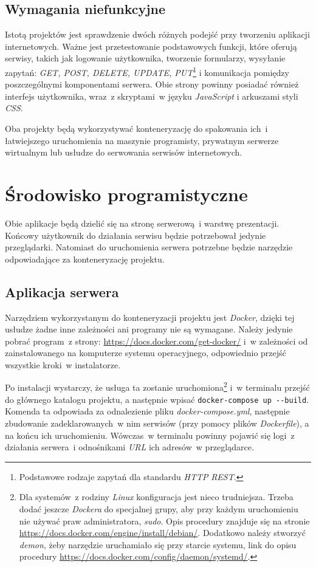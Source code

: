 \subsection{Wymagania niefunkcyjne}
Istotą projektów jest sprawdzenie dwóch różnych podejść przy tworzeniu aplikacji internetowych. Ważne jest przetestowanie podstawowych funkcji, które oferują serwisy, takich jak logowanie użytkownika, tworzenie formularzy, wysyłanie zapytań: \textit{GET, POST, DELETE, UPDATE, PUT}\footnote{Podstawowe rodzaje zapytań dla standardu \textit{HTTP} \textit{REST}.} i komunikacja pomiędzy poszczególnymi komponentami serwera. Obie strony powinny posiadać również interfejs użytkownika, wraz~z skryptami~w języku \textit{JavaScript} i arkuszami styli \textit{CSS}.

Oba projekty będą wykorzystywać konteneryzację do spakowania ich~i łatwiejszego uruchomienia na maszynie programisty, prywatnym serwerze wirtualnym lub usłudze do serwowania serwisów internetowych.

\section{Środowisko programistyczne}
Obie aplikacje będą dzielić się na stronę serwerową~i warstwę prezentacji. Końcowy użytkownik do działania serwisu będzie potrzebował jedynie przeglądarki. Natomiast do uruchomienia serwera potrzebne będzie narzędzie odpowiadające za konteneryzację projektu.
 \subsection{Aplikacja serwera}
 Narzędziem wykorzystanym do konteneryzacji projektu jest \textit{Docker}, dzięki tej usłudze żadne inne zależności ani programy nie są wymagane. Należy jedynie pobrać program~z strony: \url{https://docs.docker.com/get-docker/} i~w zależności od zainstalowanego na komputerze systemu operacyjnego, odpowiednio przejść wszystkie kroki~w instalatorze.
 
 Po instalacji wystarczy, że usługa ta zostanie uruchomiona\footnote{Dla systemów~z rodziny \textit{Linux} konfiguracja jest nieco trudniejsza. Trzeba dodać jeszcze \textit{Dockera} do specjalnej grupy, aby przy każdym uruchomieniu nie używać praw administratora, \textit{sudo}. Opis procedury znajduje się na stronie \url{https://docs.docker.com/engine/install/debian/}. Dodatkowo należy stworzyć \textit{demon}, żeby narzędzie uruchamiało się przy starcie systemu, link do opisu procedury \url{https://docs.docker.com/config/daemon/systemd/}.} i~w terminalu przejść do głównego katalogu projektu, a następnie wpisać \verb|docker-compose up --build|. Komenda ta odpowiada za odnalezienie pliku \textit{docker-compose.yml}, następnie zbudowanie zadeklarowanych~w nim serwisów (przy pomocy plików \textit{Dockerfile}), a na końcu ich uruchomieniu\cite{docker}. Wówczas~w terminalu powinny pojawić się logi~z działania serwera~i odnośnikami \textit{URL} ich adresów~w przeglądarce.

